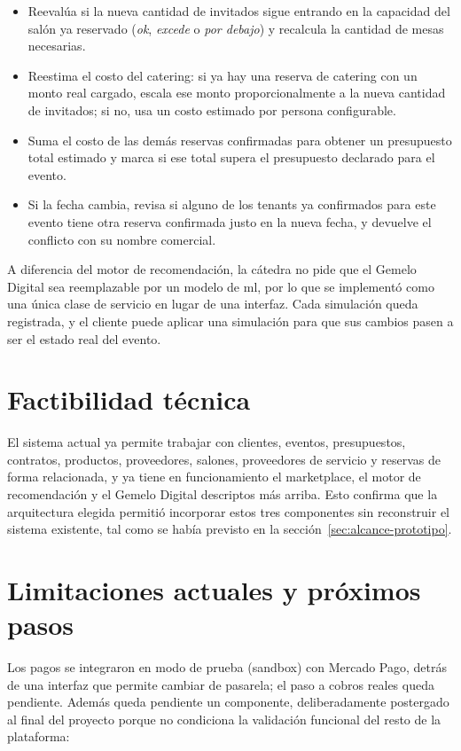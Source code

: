 \begin{itemize}
    \item Reevalúa si la nueva cantidad de invitados sigue entrando en la
          capacidad del salón ya reservado (\emph{ok}, \emph{excede} o
          \emph{por debajo}) y recalcula la cantidad de mesas necesarias.
    \item Reestima el costo del catering: si ya hay una reserva de
          catering con un monto real cargado, escala ese monto
          proporcionalmente a la nueva cantidad de invitados; si no, usa
          un costo estimado por persona configurable.
    \item Suma el costo de las demás reservas confirmadas para obtener un
          presupuesto total estimado y marca si ese total supera el
          presupuesto declarado para el evento.
    \item Si la fecha cambia, revisa si alguno de los tenants ya
          confirmados para este evento tiene otra reserva confirmada
          justo en la nueva fecha, y devuelve el conflicto con su nombre
          comercial.
\end{itemize}

A diferencia del motor de recomendación, la cátedra no pide que el
Gemelo Digital sea reemplazable por un modelo de \gls{ml}, por lo que se
implementó como una única clase de servicio en lugar de una interfaz.
Cada simulación queda registrada, y el cliente puede aplicar una
simulación para que sus cambios pasen a ser el estado real del evento.

\section{Factibilidad técnica}

El sistema actual ya permite trabajar con clientes, eventos,
presupuestos, contratos, productos, proveedores, salones, proveedores de
servicio y reservas de forma relacionada, y ya tiene en funcionamiento el
marketplace, el motor de recomendación y el Gemelo Digital descriptos
más arriba. Esto confirma que la arquitectura elegida permitió incorporar
estos tres componentes sin reconstruir el sistema existente, tal como se
había previsto en la sección~\ref{sec:alcance-prototipo}.

\section{Limitaciones actuales y próximos pasos}

Los pagos se integraron en modo de prueba (sandbox) con Mercado Pago,
detrás de una interfaz que permite cambiar de pasarela; el paso a cobros
reales queda pendiente. Además queda pendiente un componente,
deliberadamente postergado al final del proyecto porque no condiciona la
validación funcional del resto de la plataforma:

